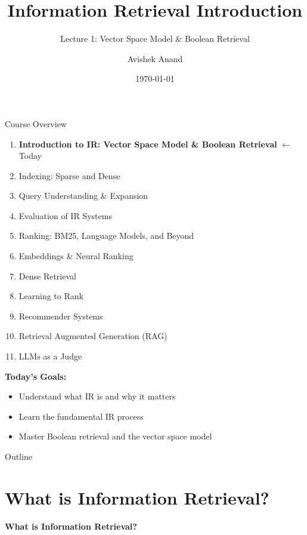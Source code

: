 \documentclass[aspectratio=169]{beamer}
\title[Introduction to IR]{Information Retrieval Introduction}
\subtitle{Lecture 1: Vector Space Model \& Boolean Retrieval}
\author{Avishek Anand}
\institute{Information Retrieval}
\date{\today}
\newif\ifanimated
\newcommand{\cpause}{\ifanimated\pause\fi}
\begin{document}
\begin{frame}
\titlepage
\end{frame}

\begin{frame}{Course Overview}
\begin{enumerate}
    \item \textbf{Introduction to IR: Vector Space Model \& Boolean Retrieval} $\leftarrow$ Today
    \item Indexing: Sparse and Dense
    \item Query Understanding \& Expansion
    \item Evaluation of IR Systems
    \item Ranking: BM25, Language Models, and Beyond
    \item Embeddings \& Neural Ranking
    \item Dense Retrieval
    \item Learning to Rank
    \item Recommender Systems
    \item Retrieval Augmented Generation (RAG)
    \item LLMs as a Judge
\end{enumerate}
\cpause
\vspace{1em}
\textbf{Today's Goals:}
\begin{itemize}
    \item Understand what IR is and why it matters
    \item Learn the fundamental IR process
    \item Master Boolean retrieval and the vector space model
\end{itemize}
\end{frame}

\begin{frame}{Outline}
\tableofcontents
\end{frame}

\section{What is Information Retrieval?}
\begin{frame}
  \centering
  \LARGE \textbf{What is Information Retrieval?}
\end{frame}
\end{document}
